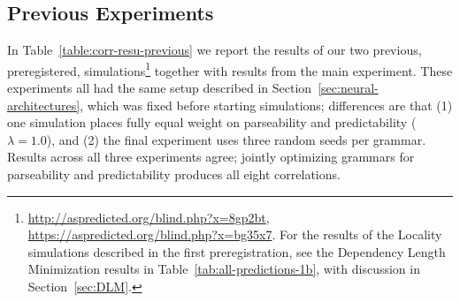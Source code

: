 \documentclass[10pt,twoside,lineno]{article}
\begin{document}
\subsection{Previous Experiments}\label{sec:previous-exps}
In Table~\ref{table:corr-resu-previous} we report the results of our two previous, preregistered, simulations\footnote{\url{http://aspredicted.org/blind.php?x=8gp2bt}, \url{https://aspredicted.org/blind.php?x=bg35x7}. For the results of the Locality simulations described in the first preregistration, see the Dependency Length Minimization results in Table~\ref{tab:all-predictions-1b}, with discussion in Section~\ref{sec:DLM}.} together with results from the main experiment.
These experiments all had the same setup described in Section~\ref{sec:neural-architectures}, which was fixed before starting simulations; differences are that (1) one simulation places fully equal weight on parseability and predictability ($\lambda=1.0$), and (2) the final experiment uses three random seeds per grammar.
Results across all three experiments agree; jointly optimizing grammars for parseability and predictability produces all eight correlations.
\end{document}
